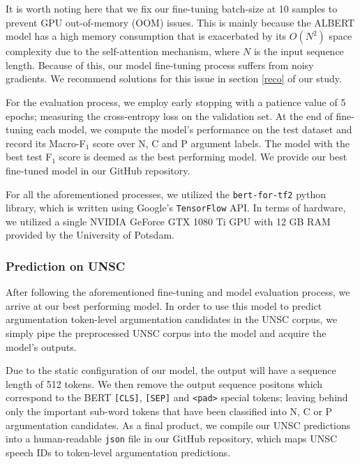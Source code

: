It is worth noting here that we fix our fine-tuning batch-size at 10 samples to prevent GPU out-of-memory (OOM) issues. This is mainly because the ALBERT model has a high memory consumption that is exacerbated by its $O(N^2)$ space complexity due to the self-attention mechanism, where $N$ is the input sequence length. Because of this, our model fine-tuning process suffers from noisy gradients. We recommend solutions for this issue in section \ref{reco} of our study.

For the evaluation process, we employ early stopping with a patience value of 5 epochs; measuring the cross-entropy loss on the validation set. At the end of fine-tuning each model, we compute the model's performance on the test dataset and record its Macro-F$_1$ score over N, C and P argument labels. The model with the best test F$_1$ score is deemed as the best performing model. We provide our best fine-tuned model in our GitHub repository\footnotemark[\value{footnote}].

For all the aforementioned processes, we utilized the \texttt{bert-for-tf2} python library, which is written using Google's \texttt{TensorFlow} API. In terms of hardware, we utilized a single NVIDIA GeForce GTX 1080 Ti GPU with 12 GB RAM provided by the University of Potsdam.

\subsubsection{Prediction on UNSC}

After following the aforementioned fine-tuning and model evaluation process, we arrive at our best performing model. In order to use this model to predict argumentation token-level argumentation candidates in the UNSC corpus, we simply pipe the preprocessed UNSC corpus into the model and acquire the model's outputs.

Due to the static configuration of our model, the output will have a sequence length of 512 tokens. We then remove the output sequence positons which correspond to the BERT \texttt{[CLS]}, \texttt{[SEP]} and \texttt{<pad>} special tokens; leaving behind only the important sub-word tokens that have been classified into N, C or P argumentation candidates. As a final product, we compile our UNSC predictions into a human-readable \texttt{json} file in our GitHub repository\footnotemark[\value{footnote}], which maps UNSC speech IDs to token-level argumentation predictions.